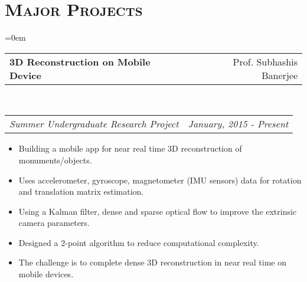 \documentclass{article}
\makeatletter
\newcommand{\headerrow}[2]
{\begin{tabular*}{\linewidth}{l@{\extracolsep{\fill}}r}
	#1 &
	#2 \\
\end{tabular*}}
\newcommand{\tmpsection}[1]{}
\let\tmpsection=\section
\renewcommand{\section}[1]{\tmpsection*{\textsc{#1}}}
\makeatother
\begin{document}
\section{Major Projects}
\begin{list} {}{\leftmargin=0em}
\setlength{\leftmargin}{0pt}
\item[]
  \headerrow
    {\textbf{3D Reconstruction on Mobile Device}}
    {Prof. Subhashis Banerjee}
  \\
  \headerrow
    {\emph{Summer Undergraduate Research Project}}
    {\emph{January, 2015 - Present}}
      \begin{itemize}
        \item Building a mobile app for near real time 3D reconstruction of monuments/objects.
        \item Uses accelerometer, gyroscope, magnetometer (IMU sensors) data for rotation and translation matrix estimation. 
        \item Using a Kalman filter, dense and sparse optical flow to improve the extrinsic camera parameters. 
        \item Designed a 2-point algorithm to reduce computational complexity. 
        \item The challenge is to complete dense 3D reconstruction in near real time on mobile devices.


\end{itemize}
\end{list}
\end{document}
